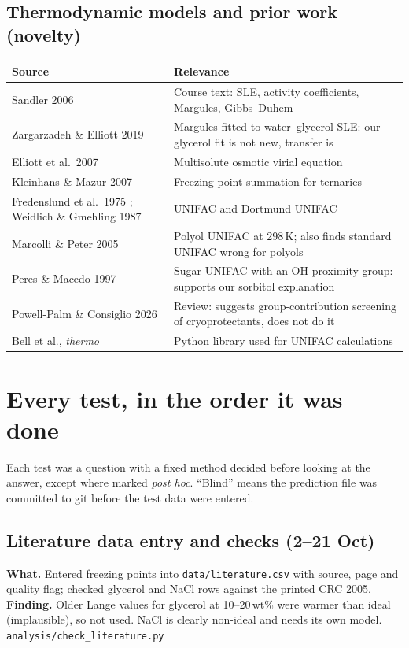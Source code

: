 \documentclass[11pt,a4paper]{article}
\newcommand{\file}[1]{\texttt{\small #1}}
\begin{document}
\subsection*{Thermodynamic models and prior work (novelty)}
\begin{xltabular}{\textwidth}{@{}p{4.2cm}L@{}}
\toprule
Source & Relevance\\
\midrule
Sandler 2006 \cite{sandler} & Course text: SLE, activity coefficients, Margules, Gibbs--Duhem\\
Zargarzadeh \& Elliott 2019 \cite{zargarzadeh} & Margules fitted to water--glycerol SLE: our glycerol fit is not new, transfer is\\
Elliott et al.\ 2007 \cite{elliott} & Multisolute osmotic virial equation\\
Kleinhans \& Mazur 2007 \cite{km} & Freezing-point summation for ternaries\\
Fredenslund et al.\ 1975 \cite{unifac}; Weidlich \& Gmehling 1987 \cite{dortmund} & UNIFAC and Dortmund UNIFAC\\
Marcolli \& Peter 2005 \cite{marcolli} & Polyol UNIFAC at 298\,K; also finds standard UNIFAC wrong for polyols\\
Peres \& Macedo 1997 \cite{peres} & Sugar UNIFAC with an OH-proximity group: supports our sorbitol explanation\\
Powell-Palm \& Consiglio 2026 \cite{powellpalm} & Review: suggests group-contribution screening of cryoprotectants, does not do it\\
Bell et al., \emph{thermo} \cite{thermo} & Python library used for UNIFAC calculations\\
\bottomrule
\end{xltabular}

\section{Every test, in the order it was done}

Each test was a question with a fixed method decided before looking at the answer, except where marked
\emph{post hoc}. ``Blind'' means the prediction file was committed to git before the test data were entered.

\subsection{Literature data entry and checks (2--21 Oct)}
\textbf{What.} Entered freezing points into \file{data/literature.csv} with source, page and quality flag; checked
glycerol and NaCl rows against the printed CRC 2005.
\textbf{Finding.} Older Lange values for glycerol at 10--20\,wt\% were warmer than ideal (implausible), so not used.
NaCl is clearly non-ideal and needs its own model. \file{analysis/check\_literature.py}
\end{document}

